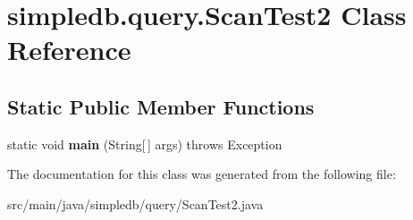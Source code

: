 \hypertarget{classsimpledb_1_1query_1_1ScanTest2}{}\section{simpledb.\+query.\+Scan\+Test2 Class Reference}
\label{classsimpledb_1_1query_1_1ScanTest2}
\subsection*{Static Public Member Functions}
\begin{DoxyCompactItemize}
\item 
\mbox{\label{classsimpledb_1_1query_1_1ScanTest2_af18202133fca050b2d494976212ab124}} 
static void {\bfseries main} (String\mbox{[}$\,$\mbox{]} args)  throws Exception 
\end{DoxyCompactItemize}


The documentation for this class was generated from the following file\+:\begin{DoxyCompactItemize}
\item 
src/main/java/simpledb/query/Scan\+Test2.\+java\end{DoxyCompactItemize}
